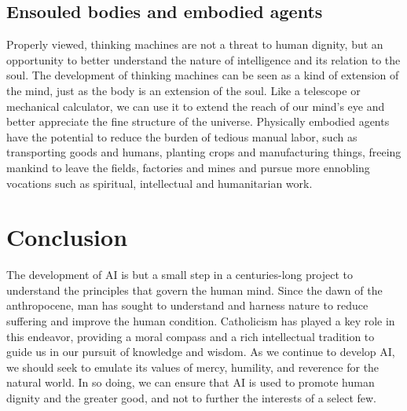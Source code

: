 \documentclass[sigplan,nonacm]{acmart}\settopmatter{printfolios=false,printccs=false,printacmref=false}
\begin{document}
  \subsection{Ensouled bodies and embodied agents}

  Properly viewed, thinking machines are not a threat to human dignity, but an opportunity to better understand the nature of intelligence and its relation to the soul. The development of thinking machines can be seen as a kind of extension of the mind, just as the body is an extension of the soul. Like a telescope or mechanical calculator, we can use it to extend the reach of our mind's eye and better appreciate the fine structure of the universe. Physically embodied agents have the potential to reduce the burden of tedious manual labor, such as transporting goods and humans, planting crops and manufacturing things, freeing mankind to leave the fields, factories and mines and pursue more ennobling vocations such as spiritual, intellectual and humanitarian work.

  \clearpage\section{Conclusion}

  The development of AI is but a small step in a centuries-long project to understand the principles that govern the human mind. Since the dawn of the anthropocene, man has sought to understand and harness nature to reduce suffering and improve the human condition. Catholicism has played a key role in this endeavor, providing a moral compass and a rich intellectual tradition to guide us in our pursuit of knowledge and wisdom. As we continue to develop AI, we should seek to emulate its values of mercy, humility, and reverence for the natural world. In so doing, we can ensure that AI is used to promote human dignity and the greater good, and not to further the interests of a select few.

  
\clearpage
\end{document}
